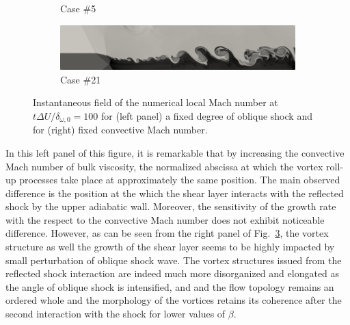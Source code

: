 \documentclass[conf]{new-aiaa}
\newcommand*{\dwz}{\delta_{\omega,0}}
\begin{document}
\begin{figure}[!ht]
\begin{subfigure}{.48\textwidth}
\caption{Case \#5}
\label{fig:mach5}
\end{subfigure}
\begin{subfigure}{.48\textwidth}
\includegraphics[width=0.99\columnwidth]{figs/mach-21-crop.png}
\caption{Case \#21}
\label{fig:mach21}
\end{subfigure}
\caption{Instantaneous field of the numerical local Mach number at $t\Delta U/\dwz= 100$ for (left panel) a fixed degree of oblique shock and for (right) fixed convective Mach number.}
\label{fig:fixedangle}
\end{figure}
%
In this left panel of this figure, it is remarkable that by increasing the convective Mach number of bulk viscosity, the normalized abscissa at which the vortex roll-up processes take place at approximately the same position.
%
The main observed difference is the position at the which the shear layer interacts with the reflected shock by the upper adiabatic wall. 
%
Moreover, the sensitivity of the growth rate with the respect to the convective Mach number does not exhibit noticeable difference.
%
However, as can be seen from the right panel of Fig.~\ref{fig:fixedangle}, the vortex structure as well the growth of the shear layer seems to be highly impacted by small perturbation of oblique shock wave. 
%
The vortex structures issued from the reflected shock interaction are indeed much more disorganized and elongated as the angle of oblique shock is intensified, and and the flow topology remains an ordered whole and the morphology of the vortices retains its coherence after the second interaction with the shock for lower values of $\beta$.
\end{document}
